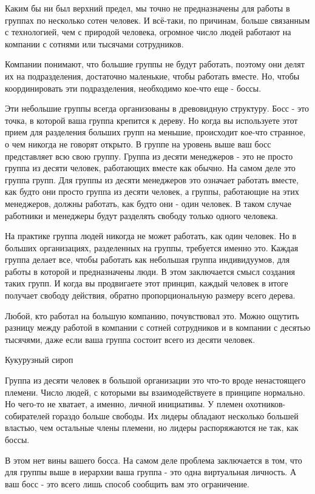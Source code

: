 \documentclass[ebook,12pt,oneside,openany]{memoir}
\begin{document}
Каким бы ни был верхний предел, мы точно не предназначены для работы в
группах по несколько сотен человек. И всё-таки, по причинам, больше
связанным с технологией, чем с природой человека, огромное число людей
работают на компании с сотнями или тысячами сотрудников.

Компании понимают, что большие группы не будут работать, поэтому они
делят их на подразделения, достаточно маленькие, чтобы работать
вместе. Но, чтобы координировать эти подразделения, необходимо кое-что
еще - боссы.

Эти небольшие группы всегда организованы в древовидную структуру. Босс
- это точка, в которой ваша группа крепится к дереву. Но когда вы
используете этот прием для разделения больших групп на меньшие,
происходит кое-что странное, о чем никогда не говорят открыто. В
группе на уровень выше ваш босс представляет всю свою группу. Группа
из десяти менеджеров - это не просто группа из десяти человек,
работающих вместе как обычно. На самом деле это группа групп. Для
группы из десяти менеджеров это означает работать вместе, как будто
они просто группа из десяти человек, а группы, работающие на этих
менеджеров, должны работать, как будто они - один человек. В таком
случае работники и менеджеры будут разделять свободу только одного
человека.

На практике группа людей никогда не может работать, как один человек.
Но в больших организациях, разделенных на группы, требуется именно
это. Каждая группа делает все, чтобы работать как небольшая группа
индивидуумов, для работы в которой и предназначены люди. В этом
заключается смысл создания таких групп. И когда вы продвигаете этот
принцип, каждый человек в итоге получает свободу действия, обратно
пропорциональную размеру всего дерева.

Любой, кто работал на большую компанию, почувствовал это. Можно
ощутить разницу между работой в компании с сотней сотрудников и в
компании с десятью тысячями, даже если ваша группа состоит всего из
десяти человек.

Кукурузный сироп

Группа из десяти человек в большой организации это что-то вроде
ненастоящего племени. Число людей, с которыми вы взаимодействуете в
принципе нормально. Но чего-то не хватает, а именно, личной
инициативы. У племен охотников-собирателей гораздо больше свободы. Их
лидеры обладают несколько большей властью, чем остальные члены
племени, но лидеры распоряжаются не так, как боссы.

В этом нет вины вашего босса. На самом деле проблема заключается в
том, что для группы выше в иерархии ваша группа - это одна виртуальная
личность. А ваш босс - это всего лишь способ сообщить вам это
ограничение.
\end{document}
